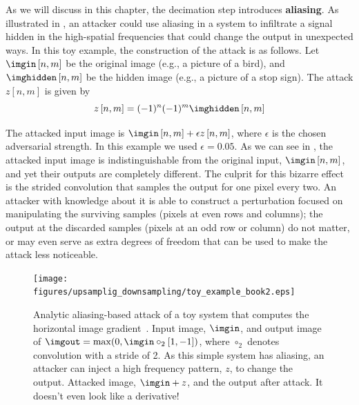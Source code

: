 

As we will discuss in this chapter, the decimation step introduces {\bf aliasing}. As illustrated in \fig{\ref{figure:simple-network}}, an attacker could use aliasing in a system to infiltrate a signal hidden in the high-spatial frequencies that could change the output in unexpected ways. 
In this toy example, the construction of the attack is as follows. Let $\imgin \left[n,m\right]$ be the original image (e.g., a picture of a bird), and $\imghidden \left[n,m\right]$ be the hidden image (e.g., a picture of a stop sign). The attack $z \left[n,m\right]$ is given by
\begin{equation}
    \label{equation:aliasing-attack}
    z \left[n,m\right] = (-1)^n(-1)^m \imghidden \left[n,m\right]
\end{equation}
 
The attacked input image is $\imgin \left[n,m\right]+ \epsilon z \left[n,m\right]$, where $\epsilon$ is the chosen adversarial strength. In this example we used $\epsilon=0.05$. As we can see in \fig{\ref{figure:simple-network}}, the attacked input image is indistinguishable from the original input, $\imgin \left[n,m\right]$, and yet their outputs are completely different. The culprit for this bizarre effect is the strided convolution that samples the output for one pixel every two. An attacker with knowledge about it is able to construct a perturbation focused on manipulating the surviving samples (pixels at even rows and columns); the output at the discarded samples (pixels at an odd row or column) do not matter, or may even serve as extra degrees of freedom that can be used to make the attack less noticeable.




\begin{figure}[t]
	\centerline{
    \texttt{[image: figures/upsamplig\_downsampling/toy\_example\_book2.eps]}
    }
    \caption{Analytic aliasing-based attack of a toy system that computes the horizontal image gradient~\cite{rodríguezmuñoz2022aliasing}. Input image, $\imgin$, and  output image of $\imgout=\max(0, \imgin \circ_2 [1, -1])$, where $\circ_2$ denotes convolution with a stride of 2. As this simple system has aliasing, an attacker can inject a high frequency pattern, $z$, to change the output. Attacked image, $\imgin+z$, and the output after attack. It doesn't even look like a derivative!}
    \label{figure:simple-network}
\end{figure}


